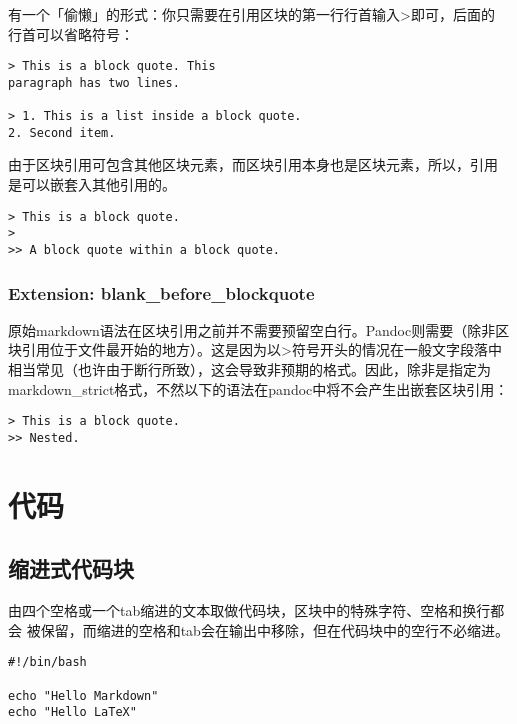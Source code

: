\documentclass[cn]{elegantbook}
\begin{document}
有一个「偷懒」的形式：你只需要在引用区块的第一行行首输入\textgreater 即可，后面的
行首可以省略符号：

\begin{lstlisting}
> This is a block quote. This
paragraph has two lines.

> 1. This is a list inside a block quote.
2. Second item.
\end{lstlisting}

由于区块引用可包含其他区块元素，而区块引用本身也是区块元素，所以，引用
是可以嵌套入其他引用的。

\begin{lstlisting}
> This is a block quote.
>
>> A block quote within a block quote.
\end{lstlisting}

\hypertarget{extension-blank_before_blockquote}{%
\subsubsection{Extension:
blank\_before\_blockquote}\label{extension-blank_before_blockquote}}

原始markdown语法在区块引用之前并不需要预留空白行。Pandoc则需要（除非区
块引用位于文件最开始的地方）。这是因为以\textgreater 符号开头的情况在一般文字段落中
相当常见（也许由于断行所致），这会导致非预期的格式。因此，除非是指定为
markdown\_strict格式，不然以下的语法在pandoc中将不会产生出嵌套区块引用：

\begin{lstlisting}
> This is a block quote.
>> Nested.
\end{lstlisting}

\hypertarget{ux4ee3ux7801}{%
\section{代码}\label{ux4ee3ux7801}}

\hypertarget{ux7f29ux8fdbux5f0fux4ee3ux7801ux5757}{%
\subsection{缩进式代码块}\label{ux7f29ux8fdbux5f0fux4ee3ux7801ux5757}}

由四个空格或一个tab缩进的文本取做代码块，区块中的特殊字符、空格和换行都会
被保留，而缩进的空格和tab会在输出中移除，但在代码块中的空行不必缩进。

\begin{lstlisting}
#!/bin/bash

echo "Hello Markdown"
echo "Hello LaTeX"
\end{lstlisting}
\end{document}
